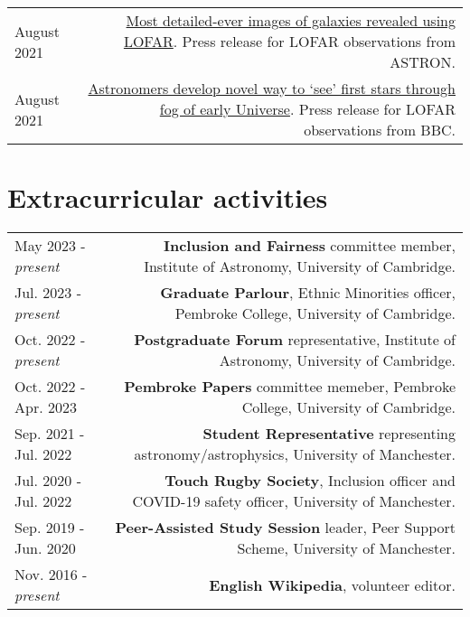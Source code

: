 \documentclass{article}
\begin{document}
\begin{tabular}{L!{\vrule}R}
	August 2021 & \href{https://www.astron.nl/most-detailed-ever-images-of-galaxies-revealed-using-lofar }{Most detailed-ever images of galaxies revealed using LOFAR}. Press release for LOFAR observations from ASTRON. \\
	August 2021 & \href{https://www.bbc.co.uk/news/science-environment-57998940}{Astronomers develop novel way to ‘see’ first stars through fog of early Universe}. Press release for LOFAR observations from BBC. \\
\end{tabular}

\section*{Extracurricular activities}
\begin{tabular}{L!{\vrule}R}

  May 2023 - \textit{present} & \textbf{Inclusion and Fairness} committee member, Institute of Astronomy, University of Cambridge. \\

  Jul. 2023 - \textit{present} & \textbf{Graduate Parlour}, Ethnic Minorities officer, Pembroke College, University of Cambridge. \\

  Oct. 2022 - \textit{present} & \textbf{Postgraduate Forum} representative, Institute of Astronomy, University of Cambridge. \\

  Oct. 2022 - Apr. 2023 & \textbf{Pembroke Papers} committee memeber, Pembroke College, University of Cambridge. \\

  Sep. 2021 - Jul. 2022 & \textbf{Student Representative} representing astronomy/astrophysics, University of Manchester. \\

  Jul. 2020 - Jul. 2022 & \textbf{Touch Rugby Society}, Inclusion officer and COVID-19 safety officer, University of Manchester. \\

	Sep. 2019 - Jun. 2020 & \textbf{Peer-Assisted Study Session} leader, Peer Support Scheme, University of Manchester. \\

	Nov. 2016 - \textit{present} & \textbf{English Wikipedia}, volunteer editor. \\
\end{tabular}
\end{document}
